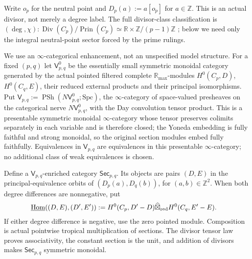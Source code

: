 \documentclass[11pt]{amsart}
\theoremstyle{definition}
\theoremstyle{remark}
\newcommand{\R}{\mathbb R}
\newcommand{\Z}{\mathbb Z}
\newcommand{\Div}{\operatorname{Div}}
\newcommand{\Prin}{\operatorname{Prin}}
\begin{document}
Write $o_p$ for the neutral point and
$D_p(a):=a[o_p]$ for $a\in\Z$.  This is an actual divisor, not merely a
degree label.  The full divisor-class classification is
$(\deg,\chi):\Div(C_p)/\Prin(C_p)\simeq
\R\times\Z/(p-1)\Z$ \cite[Theorem~5.6]{CC-ScalingSite}; below we need only
the integral neutral-point sector forced by the prime rulings.

We use an $\infty$-categorical enhancement, not an unspecified model
structure.  For a fixed $(p,q)$ let $\mathsf V^0_{p,q}$ be the essentially small
symmetric monoidal category generated by the actual pointed filtered
complete $\R_{\max}$-modules $H^0(C_p,D)$, $H^0(C_q,E)$, their reduced
external products and their principal isomorphisms.  Put
$\mathsf V_{p,q}:=\operatorname{PSh}(N\mathsf V^0_{p,q};\mathrm{Spc})$,
the $\infty$-category of space-valued presheaves on the categorical nerve
$N\mathsf V^0_{p,q}$, with the Day convolution tensor product.  This is a
presentable symmetric monoidal $\infty$-category whose tensor preserves
colimits separately in each variable and is therefore closed; the Yoneda
embedding is fully faithful and strong monoidal, so the original section
modules embed fully faithfully.  Equivalences in $\mathsf V_{p,q}$ are equivalences in this
presentable $\infty$-category; no additional class of weak equivalences is
chosen.

Define a $\mathsf V_{p,q}$-enriched category $\mathsf{Sec}_{p,q}$.  Its
objects are pairs $(D,E)$ in the principal-equivalence orbits of
$(D_p(a),D_q(b))$, for $(a,b)\in\Z^2$.  When both degree differences are
nonnegative, put
\begin{align}\label{eq:periodicEnrichedHom}
 \underline{\operatorname{Hom}}((D,E),(D',E'))
 &:={H^0(C_p,D'-D)}\widehat\boxtimes_{\rm red}{H^0(C_q,E'-E)}.
\end{align}
If either degree difference is negative, use the zero pointed module.
Composition is actual pointwise tropical multiplication of sections.  The
divisor tensor law proves associativity, the constant section is the unit,
and addition of divisors makes $\mathsf{Sec}_{p,q}$ symmetric monoidal.
\end{document}
